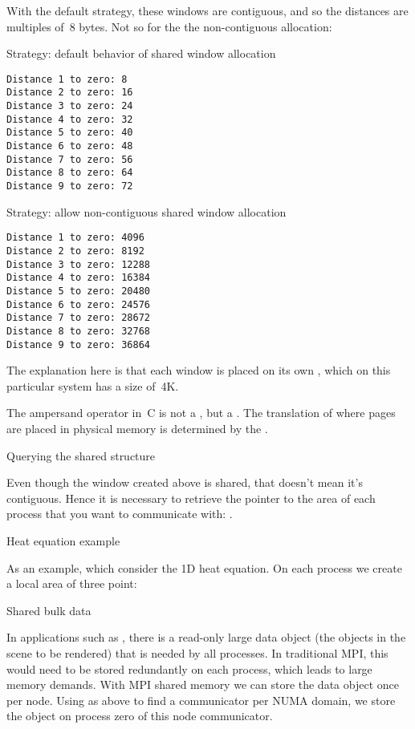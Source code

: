 With the default strategy, these windows are contiguous,
and so the distances are multiples of~8 bytes.
Not so for the the non-contiguous allocation:
%
\begin{multicols}{2}
Strategy: default behavior of shared window allocation
\begin{verbatim}
Distance 1 to zero: 8
Distance 2 to zero: 16
Distance 3 to zero: 24
Distance 4 to zero: 32
Distance 5 to zero: 40
Distance 6 to zero: 48
Distance 7 to zero: 56
Distance 8 to zero: 64
Distance 9 to zero: 72
\end{verbatim}
\columnbreak
Strategy: allow non-contiguous shared window allocation
\begin{verbatim}
Distance 1 to zero: 4096
Distance 2 to zero: 8192
Distance 3 to zero: 12288
Distance 4 to zero: 16384
Distance 5 to zero: 20480
Distance 6 to zero: 24576
Distance 7 to zero: 28672
Distance 8 to zero: 32768
Distance 9 to zero: 36864
\end{verbatim}
\end{multicols}

The explanation here is that each window is placed 
on its own ,
which on this particular system has a size of~4K.

\begin{remark}
  The ampersand operator in~C is not a
  , but a
  .
  The translation of where pages are placed in physical memory
  is determined by the .
\end{remark}

 {Querying the shared structure}

Even though the window created above is shared, that doesn't mean it's
contiguous. Hence it is necessary to retrieve the pointer to the area
of each process that you want to communicate with:
.


 {Heat equation example}

As an example, which consider the 1D heat equation. On each process we
create a local area of three point:
%

 {Shared bulk data}

In applications such as , there is a read-only
large data object (the objects in the scene to be rendered) that is
needed by all processes. In traditional MPI, this would need to be
stored redundantly on each process, which leads to large memory
demands. With MPI shared memory we can store the data object once per
node. Using as above  to find a
communicator per \ac{NUMA} domain, we store the object on process zero
of this node communicator.

